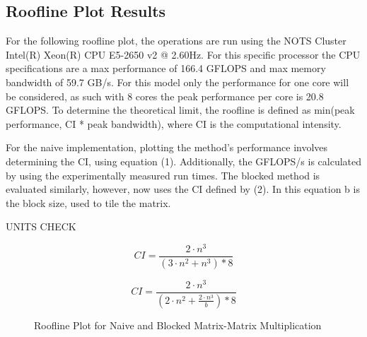 \documentclass{article}
\begin{document}
\subsection{Roofline Plot Results}

For the following roofline plot, the operations are run using the NOTS Cluster Intel(R) Xeon(R) CPU E5-2650 v2 @ 2.60Hz. For this specific processor the CPU specifications are a max performance of 166.4 GFLOPS and max memory bandwidth of 59.7 GB/s. For this  model only the performance for one core will be considered, as such with 8 cores the peak performance per core is 20.8 GFLOPS. To determine the theoretical limit, the roofline is defined as min(peak performance, CI * peak bandwidth), where CI is the computational intensity. 

\noindent For the naive implementation, plotting the method's performance involves determining the CI, using equation (1). Additionally, the GFLOPS/s is calculated by using the experimentally measured run times. The blocked method is evaluated similarly, however, now uses the CI defined by (2). In this equation b is the block size, used to tile the matrix. 

UNITS CHECK

\begin{equation}
CI = \frac{2 \cdot n^{3}}{(3 \cdot n^{2} + n^{3}) * 8}
\end{equation}

\begin{equation}
CI = \frac{2 \cdot n^{3}}{(2 \cdot n^{2} + \frac{2 \cdot n^{3}}{b}) * 8}
\end{equation}

\begin{figure}[!htb]
    \centering
    \caption{Roofline Plot for Naive and Blocked Matrix-Matrix Multiplication}
\end{figure}
\end{document}
